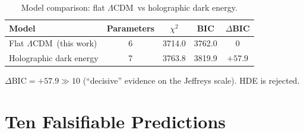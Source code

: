 \documentclass[12pt,a4paper]{article}
\newcommand{\lcdm}{\ensuremath{\Lambda}CDM}
\begin{document}
\begin{table}[h]
\centering
\caption{Model comparison: flat \lcdm\ vs holographic dark energy.}
\label{tab:modelcomp}
\begin{tabular}{@{}lcccc@{}}
\toprule
Model & Parameters & $\chi^2$ & BIC & $\Delta$BIC \\
\midrule
Flat \lcdm\ (this work) & 6 & 3714.0 & 3762.0 & 0 \\
Holographic dark energy & 7 & 3763.8 & 3819.9 & $+57.9$ \\
\bottomrule
\end{tabular}
\end{table}

$\Delta\mathrm{BIC} = +57.9 \gg 10$ (``decisive'' evidence on the Jeffreys
scale). HDE is rejected.

\section{Ten Falsifiable Predictions}
\label{sec:predictions}
\end{document}
